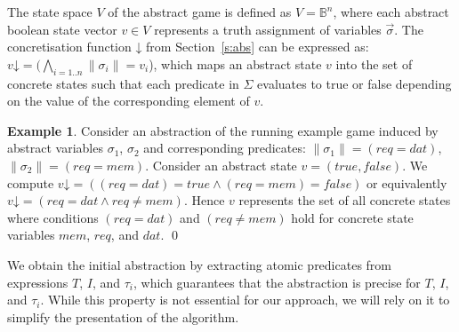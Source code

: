 \documentclass[a4paper,twoside,openright,11pt]{book}
\newcommand{\concrete}[1]{#1\mathord{\downarrow}}
\newcommand{\vect}[1]{\vec{#1}}
\theoremstyle{definition}
\newtheorem*{ex}{Example}
\begin{document}
The state space $V$ of the abstract game is defined as $V = \mathbb{B}^n$, where each abstract boolean state vector $v\in V$ represents a truth assignment of variables $\vect{\sigma}$. The concretisation function $\concrete{}$ from Section~\ref{s:abs} can be expressed as: $\concrete{v}=(\bigwedge_{i=1..n}\|\sigma_i\|=v_i$), which maps an abstract state $v$ into the set of concrete states such that each predicate in $\Sigma$ evaluates to true or false depending on the value of the corresponding element of $v$.

\begin{ex}
    \everymath{\mathtt{\xdef\tmp{\fam\the\fam\relax}\aftergroup\tmp}}
    \everydisplay{\mathtt{\xdef\tmp{\fam\the\fam\relax}\aftergroup\tmp}}
    Consider an abstraction of the running example game induced by abstract variables $\sigma_1$, $\sigma_2$ and corresponding predicates: $\|\sigma_1\| = (req=dat)$, $\|\sigma_2\| = (req = mem)$.  Consider an abstract state $v=(true,false)$. We compute $\concrete{v} = ((req=dat) = true \land (req = mem)=false)$ or equivalently $\concrete{v} = (req=dat \land req \neq mem)$.  Hence $v$ represents the set of all concrete states where conditions $(req=dat)$ and  $(req \neq mem)$ hold for concrete state variables $mem$, $req$, and $dat$.
    \qed
\end{ex}

We obtain the initial abstraction by extracting atomic predicates from expressions $T$, $I$, and $\tau_i$, which guarantees that the abstraction is precise for $T$, $I$, and $\tau_i$. While this property is not essential for our approach, we will rely on it to simplify the presentation of the algorithm.

%
\end{document}

